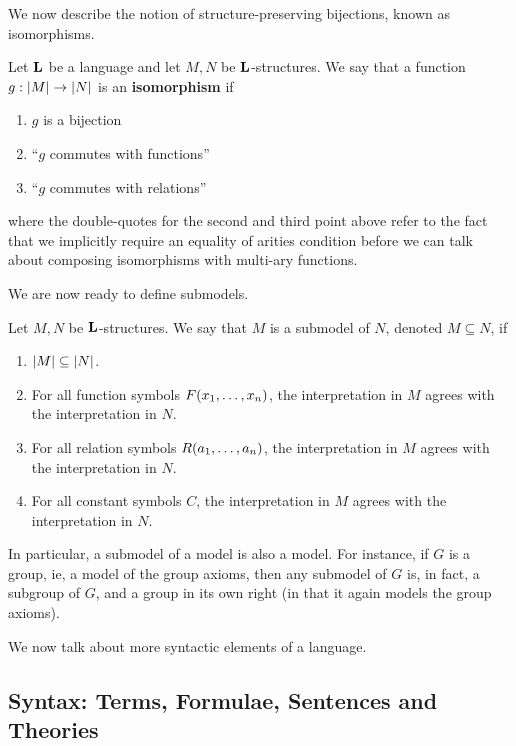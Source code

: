 We now describe the notion of structure-preserving bijections, known as isomorphisms.

\begin{boxdefinition}[Isomorphism]
    Let $\mathbf{L}$ be a language and let $M, N$ be $\mathbf{L}$-structures. We say that a function $g : \left\lvert M \right\rvert \to \left\lvert N \right\rvert$ is an \textbf{isomorphism} if
    \begin{enumerate}
        \item $g$ is a bijection
        \item ``$g$ commutes with functions''
        \item ``$g$ commutes with relations''
    \end{enumerate}
    where the double-quotes for the second and third point above refer to the fact that we implicitly require an equality of arities condition before we can talk about composing isomorphisms with multi-ary functions.
\end{boxdefinition}


We are now ready to define submodels.

\begin{boxdefinition}[Submodel]
    Let $M, N$ be $\mathbf{L}$-structures. We say that $M$ is a submodel of $N$, denoted $M \subseteq N$, if
    \begin{enumerate}
        \item $\left\lvert M \right\rvert \subseteq \left\lvert N \right\rvert$.
        \item For all function symbols $F\!\left( x_1, \ldots, x_n \right)$, the interpretation in $M$ agrees with the interpretation in $N$.
        \item For all relation symbols $R\!\left( a_1, \ldots, a_n \right)$, the interpretation in $M$ agrees with the interpretation in $N$.
        \item For all constant symbols $C$, the interpretation in $M$ agrees with the interpretation in $N$.
    \end{enumerate}
\end{boxdefinition}

In particular, a submodel of a model is also a model. For instance, if $G$ is a group, ie, a model of the group axioms, then any submodel of $G$ is, in fact, a subgroup of $G$, and a group in its own right (in that it again models the group axioms).

We now talk about more syntactic elements of a language.

\subsection{Syntax: Terms, Formulae, Sentences and Theories}

